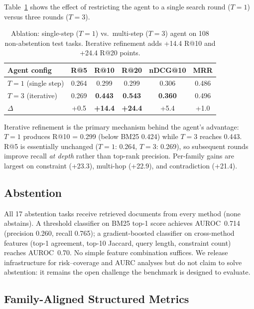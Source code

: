 \documentclass{article}
\begin{document}
Table~\ref{tab:ablation} shows the effect of restricting the agent to a single search round ($T{=}1$) versus three rounds ($T{=}3$).

\begin{table}[t]
\centering
\caption{Ablation: single-step ($T{=}1$) vs.\ multi-step ($T{=}3$) agent on 108 non-abstention test tasks. Iterative refinement adds +14.4 R@10 and +24.4 R@20 points.}
\label{tab:ablation}
\begin{tabular}{lccccc}
\toprule
\textbf{Agent config} & \textbf{R@5} & \textbf{R@10} & \textbf{R@20} & \textbf{nDCG@10} & \textbf{MRR} \\
\midrule
$T{=}1$ (single step) & 0.264 & 0.299 & 0.299 & 0.306 & 0.486 \\
$T{=}3$ (iterative) & 0.269 & \textbf{0.443} & \textbf{0.543} & \textbf{0.360} & 0.496 \\
\midrule
$\Delta$ & +0.5 & \textbf{+14.4} & \textbf{+24.4} & +5.4 & +1.0 \\
\bottomrule
\end{tabular}
\end{table}

Iterative refinement is the primary mechanism behind the agent's advantage: $T{=}1$ produces R@10 = 0.299 (below BM25 0.424) while $T{=}3$ reaches 0.443. R@5 is essentially unchanged ($T{=}1$: 0.264, $T{=}3$: 0.269), so subsequent rounds improve recall \emph{at depth} rather than top-rank precision. Per-family gains are largest on constraint (+23.3), multi-hop (+22.9), and contradiction (+21.4).

\subsection{Abstention}

All 17 abstention tasks receive retrieved documents from every method (none abstains). A threshold classifier on BM25 top-1 score achieves AUROC~0.714 (precision 0.260, recall 0.765); a gradient-boosted classifier on cross-method features (top-1 agreement, top-10 Jaccard, query length, constraint count) reaches AUROC~0.70. No simple feature combination suffices. We release infrastructure for risk--coverage and AURC analyses but do not claim to solve abstention: it remains the open challenge the benchmark is designed to evaluate.

\subsection{Family-Aligned Structured Metrics}
\label{sec:familystruct}
\end{document}
